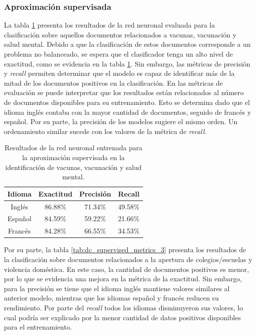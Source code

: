 \subsubsection{Aproximación supervisada}
La tabla \ref{tab:dc_supervised_metrics_2} presenta los resultados de la red neuronal evaluada para la clasificación sobre aquellos documentos relacionados a vacunas, vacunación y salud mental. Debido a que la clasificación de estos documentos corresponde a un problema no balanceado, se espera que el clasificador tenga un alto nivel de exactitud, como se evidencia en la tabla \ref{tab:dc_supervised_metrics_2}. Sin embargo, las métricas de precisión y \textit{recall} permiten determinar que el modelo es capaz de identificar más de la mitad de los documentos positivos en la clasificación. En las métricas de evaluación se puede interpretar que los resultados están relacionados al número de documentos disponibles para su entrenamiento. Esto se determina dado que el idioma inglés contaba con la mayor cantidad de documentos, seguido de francés y español. Por su parte, la precisión de los modelos sugiere el mismo orden. Un ordenamiento similar sucede con los valores de la métrica de \textit{recall}. 

\begin{table}[H]
    \centering
    \begin{tabular}{|c|c|c|c|}
        \textbf{Idioma} & \textbf{Exactitud} & \textbf{Precisión} & \textbf{Recall} \\ \hline
        Inglés & 86.88\% & 71.34\% & 49.58\% \\
        Español & 84.59\% & 59.22\% & 21.66\%  \\
        Francés & 84.28\% & 66.55\% & 34.53\% \\
    \end{tabular}
    \caption{Resultados de la red neuronal entrenada para la aproximación supervisada en la identificación de vacunas, vacunación y salud mental.}
    \label{tab:dc_supervised_metrics_2}
\end{table}

Por su parte, la tabla \ref{tab:dc_supervised_metrics_3} presenta los resultados de la clasificación sobre documentos relacionados a la apertura de colegios/escuelas y violencia doméstica. En este caso, la cantidad de documentos positivos es menor, por lo que se evidencia una mejora en la métrica de la exactitud. Sin embargo, para la precisión se tiene que el idioma inglés mantiene valores similares al anterior modelo, mientras que los idiomas español y francés reducen su rendimiento. Por parte del \textit{recall} todos los idiomas disminuyeron sus valores, lo cual podría ser explicado por la menor cantidad de datos positivos disponibles para el entrenamiento.

